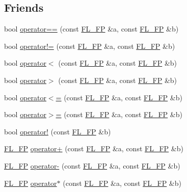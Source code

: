 \subsection*{Friends}
\begin{DoxyCompactItemize}
\item 
bool \hyperlink{class_f_l___f_p_a7f68a65590040b22d55e29f700a70090}{operator==} (const \hyperlink{class_f_l___f_p}{F\+L\+\_\+\+FP} \&a, const \hyperlink{class_f_l___f_p}{F\+L\+\_\+\+FP} \&b)
\item 
bool \hyperlink{class_f_l___f_p_a694ee4bd94433b815c7f4e5f7a2acd50}{operator!=} (const \hyperlink{class_f_l___f_p}{F\+L\+\_\+\+FP} \&a, const \hyperlink{class_f_l___f_p}{F\+L\+\_\+\+FP} \&b)
\item 
bool \hyperlink{class_f_l___f_p_a7a645d400e5b6aeaf8a3ea2a4512ab9e}{operator$<$} (const \hyperlink{class_f_l___f_p}{F\+L\+\_\+\+FP} \&a, const \hyperlink{class_f_l___f_p}{F\+L\+\_\+\+FP} \&b)
\item 
bool \hyperlink{class_f_l___f_p_ab237b013e66f2d39a3bb466e36741baf}{operator$>$} (const \hyperlink{class_f_l___f_p}{F\+L\+\_\+\+FP} \&a, const \hyperlink{class_f_l___f_p}{F\+L\+\_\+\+FP} \&b)
\item 
bool \hyperlink{class_f_l___f_p_a420177af32f27b84621b1bdc1db5d29a}{operator$<$=} (const \hyperlink{class_f_l___f_p}{F\+L\+\_\+\+FP} \&a, const \hyperlink{class_f_l___f_p}{F\+L\+\_\+\+FP} \&b)
\item 
bool \hyperlink{class_f_l___f_p_a496bb5bc687d589a5ec23c0b81dc5fb2}{operator$>$=} (const \hyperlink{class_f_l___f_p}{F\+L\+\_\+\+FP} \&a, const \hyperlink{class_f_l___f_p}{F\+L\+\_\+\+FP} \&b)
\item 
bool \hyperlink{class_f_l___f_p_a14d7541c865b9e57eaaca1c3fd2c6240}{operator!} (const \hyperlink{class_f_l___f_p}{F\+L\+\_\+\+FP} \&b)
\item 
\hyperlink{class_f_l___f_p}{F\+L\+\_\+\+FP} \hyperlink{class_f_l___f_p_a96dfe1fef405deebcdd77739a80baf4e}{operator+} (const \hyperlink{class_f_l___f_p}{F\+L\+\_\+\+FP} \&a, const \hyperlink{class_f_l___f_p}{F\+L\+\_\+\+FP} \&b)
\item 
\hyperlink{class_f_l___f_p}{F\+L\+\_\+\+FP} \hyperlink{class_f_l___f_p_a29c8d46e78c5c3a20fdfbf9904f0a25d}{operator-\/} (const \hyperlink{class_f_l___f_p}{F\+L\+\_\+\+FP} \&a, const \hyperlink{class_f_l___f_p}{F\+L\+\_\+\+FP} \&b)
\item 
\hyperlink{class_f_l___f_p}{F\+L\+\_\+\+FP} \hyperlink{class_f_l___f_p_a7c9e13210a3e8f9ef270a4895b1fc0d3}{operator$\ast$} (const \hyperlink{class_f_l___f_p}{F\+L\+\_\+\+FP} \&a, const \hyperlink{class_f_l___f_p}{F\+L\+\_\+\+FP} \&b)

\end{DoxyCompactItemize}
